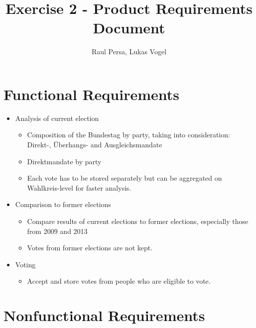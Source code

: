 \documentclass[10pt,a4paper]{article}
\author{Raul Persa, Lukas Vogel}
\title{Exercise 2 - Product Requirements Document}
\begin{document}
	\maketitle
	
	
	\section*{Functional Requirements}
	
	\begin{itemize}
		\item Analysis of current election
			\begin{itemize}
				\item Composition of the Bundestag by party, taking into consideration: Direkt-, \"Uberhangs- and Ausgleichsmandate
				\item Direktmandate by party
				\item Each vote has to be stored separately but can be aggregated on Wahlkreis-level for faster analysis.
			\end{itemize}
		\item Comparison to former elections
			\begin{itemize}
				\item Compare results of current elections to former elections, especially those from 2009 and 2013
				\item Votes from former elections are not kept.
			\end{itemize}
		\item Voting
			\begin{itemize}
				\item Accept and store votes from people who are eligible to vote.
			\end{itemize}
	\end{itemize}
	
	\section*{Nonfunctional Requirements}
	
\end{document}
